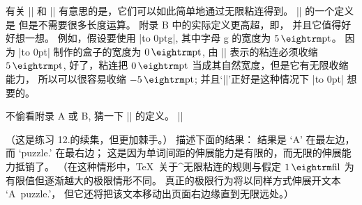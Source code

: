 \danger 有关 |\rlap| 和 |\llap| 有意思的是，它们可以如此简单地通过无限粘连得到。%
|\rlap| 的一个定义是
\begintt
\def\rlap#1{{\setbox0=\hbox{#1}\copy0\kern-\wd0}}
\endtt
但是不需要很多长度运算。%
附录 B 中的实际定义更高超，即，
\begintt
\def\rlap#1{\hbox to 0pt{#1\hss}}
\endtt
并且它值得好好想一想。%
\1例如，假设要使用 |\rlap{g}|, 其中字母 g 的宽度为 $5\pt$。%
因为 |\rlap| 制作的盒子的宽度为 $0\pt$,
由 |\hss| 表示的粘连必须收缩 $5\pt$,
好了，粘连把 $0\pt$ 当成其自然宽度，但是它有无限收缩能力，
所以可以很容易收缩 $-5\pt$;
并且`|\hskip-5pt|'正好是这种情况下 |\rlap| 想要的。

\dangerexercise 不偷看附录 A 或 B, 猜一下 |\llap| 的定义。
\answer |\def\llap#1{\hbox to 0pt{\hss#1}}|

\dangerexercise （这是练习 12.\linexno 的续集，但更加棘手。）
描述下面的结果：
\begintt
{}
\endtt
\answer 结果是 `A' 在最左边，而 `puzzle.\null' 在最右边；
这是因为单词间距的伸展能力是有限的，而无限的伸展能力抵销了。%
（在这种情形中，\TeX\ 关于^{无限粘连}的规则与假定 $1\,{\rm fil}$
为有限值但逐渐越大的极限情形不同。
真正的极限行为将以同样方式伸展开文本 `A~puzzle.\null'，
但它还将把该文本移动出页面右边缘直到无限远处。）

